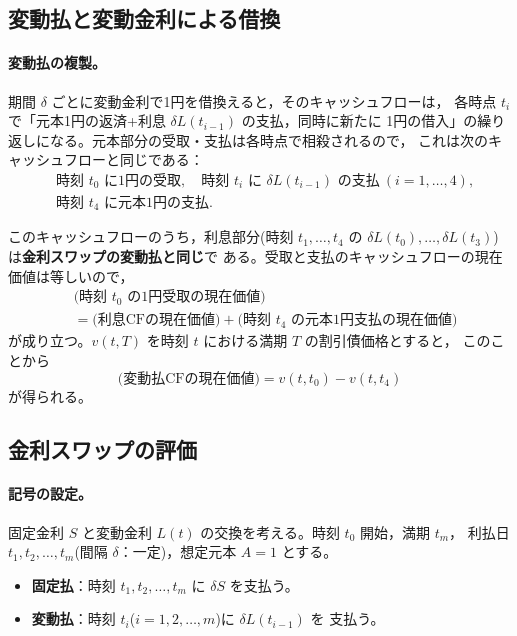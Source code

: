 \subsection{変動払と変動金利による借換}

\paragraph{変動払の複製。}
期間 $\delta$ ごとに変動金利で1円を借換えると，そのキャッシュフローは，
各時点 $t_i$ で「元本1円の返済+利息 $\delta L(t_{i-1})$ の支払，同時に新たに
1円の借入」の繰り返しになる。元本部分の受取・支払は各時点で相殺されるので，
これは次のキャッシュフローと同じである：
\begin{align*}
&\text{時刻 } t_0 \text{ に1円の受取},\quad
\text{時刻 } t_i \text{ に } \delta L(t_{i-1}) \text{ の支払}\ (i=1,\dots,4),\\
&\text{時刻 } t_4 \text{ に元本1円の支払}.
\end{align*}

このキャッシュフローのうち，利息部分(時刻 $t_1,\dots,t_4$ の
$\delta L(t_0),\dots,\delta L(t_3)$)は\textbf{金利スワップの変動払と同じ}で
ある。受取と支払のキャッシュフローの現在価値は等しいので，
\begin{align*}
&\text{(時刻 } t_0 \text{ の1円受取の現在価値)}\\
&= \text{(利息CFの現在価値)} + \text{(時刻 } t_4 \text{ の元本1円支払の現在価値)}
\end{align*}
が成り立つ。$v(t,T)$ を時刻 $t$ における満期 $T$ の割引債価格とすると，
このことから
\begin{equation}
\text{(変動払CFの現在価値)} = v(t,t_0) - v(t,t_4)
\end{equation}
が得られる。

\subsection{金利スワップの評価}

\paragraph{記号の設定。}
固定金利 $S$ と変動金利 $L(t)$ の交換を考える。時刻 $t_0$ 開始，満期 $t_m$，
利払日 $t_1,t_2,\dots,t_m$(間隔 $\delta$：一定)，想定元本 $A=1$ とする。
\begin{itemize}
\item \textbf{固定払}：時刻 $t_1,t_2,\dots,t_m$ に $\delta S$ を支払う。
\item \textbf{変動払}：時刻 $t_i$($i=1,2,\dots,m$)に $\delta L(t_{i-1})$ を
支払う。
\end{itemize}

